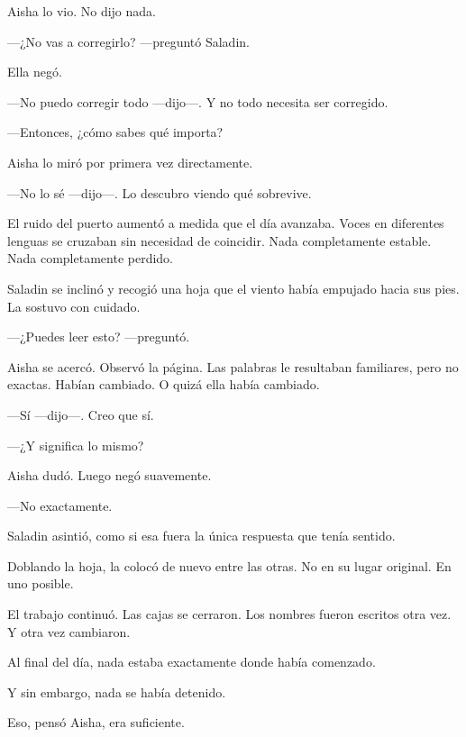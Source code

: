 Aisha lo vio. No dijo nada.

---¿No vas a corregirlo? ---preguntó Saladin.

Ella negó.

---No puedo corregir todo ---dijo---. Y no todo necesita ser corregido.

---Entonces, ¿cómo sabes qué importa?

Aisha lo miró por primera vez directamente.

---No lo sé ---dijo---. Lo descubro viendo qué sobrevive.

El ruido del puerto aumentó a medida que el día avanzaba. Voces en diferentes
lenguas se cruzaban sin necesidad de coincidir. Nada completamente estable.
Nada completamente perdido.

Saladin se inclinó y recogió una hoja que el viento había empujado hacia sus
pies. La sostuvo con cuidado.

---¿Puedes leer esto? ---preguntó.

Aisha se acercó. Observó la página. Las palabras le resultaban familiares,
pero no exactas. Habían cambiado. O quizá ella había cambiado.

---Sí ---dijo---. Creo que sí.

---¿Y significa lo mismo?

Aisha dudó. Luego negó suavemente.

---No exactamente.

Saladin asintió, como si esa fuera la única respuesta que tenía sentido.

Doblando la hoja, la colocó de nuevo entre las otras. No en su lugar original.
En uno posible.

El trabajo continuó. Las cajas se cerraron. Los nombres fueron escritos otra
vez. Y otra vez cambiaron.

Al final del día, nada estaba exactamente donde había comenzado.

Y sin embargo, nada se había detenido.

Eso, pensó Aisha, era suficiente.
